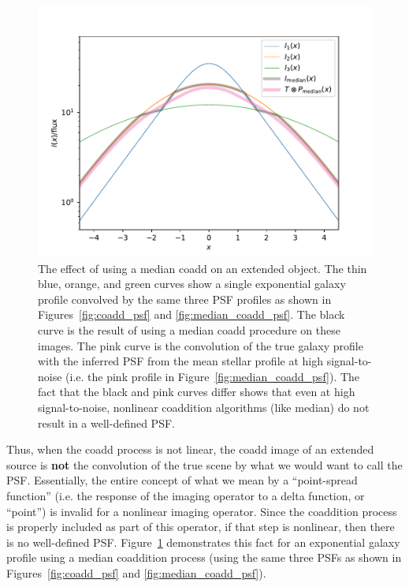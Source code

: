 \documentclass{aastex63}
\begin{document}
\begin{figure}
\begin{center}
\includegraphics[width=5in]{figures/extended.pdf}
 \caption{The effect of using a median coadd on an extended object. 
 The thin blue, orange, and green curves show a single exponential galaxy profile convolved by the 
 same three PSF profiles as shown in Figures~\ref{fig:coadd_psf} and \ref{fig:median_coadd_psf}. The black curve is the result
 of using a median coadd procedure on these images.  The pink curve is the convolution of the true
 galaxy profile with the inferred PSF from the mean stellar profile at high signal-to-noise (i.e. the pink profile in Figure~\ref{fig:median_coadd_psf}).  The fact that the
 black and pink curves differ shows that even at high signal-to-noise, nonlinear coaddition algorithms
 (like median) do not result in a well-defined PSF.} \label{fig:extended}
\end{center}
 \end{figure}

Thus, when the coadd process is not linear,
the coadd image of an extended source is {\bf not} the convolution of the true scene by what
we would want to call the PSF.
Essentially, the entire concept of what we mean by a ``point-spread function'' (i.e. the response
of the imaging operator to a delta function, or ``point'') is invalid for a nonlinear imaging operator.  
Since the coaddition process is properly included as part of this operator, if that
step is nonlinear, then there is no well-defined PSF. 
Figure~\ref{fig:extended} demonstrates this fact for an exponential galaxy profile using a median
coaddition process (using the same three PSFs as shown in Figures~\ref{fig:coadd_psf} and \ref{fig:median_coadd_psf}).
\end{document}
